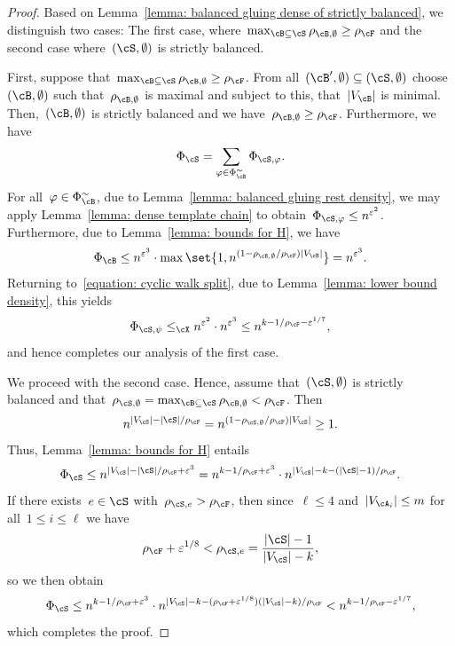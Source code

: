 \documentclass[11pt]{amsart}
\newcommand{\eps}{\varepsilon}
\DeclarePairedDelimiter{\abs}{\lvert}{\rvert}
\newcommand{\Xleq}{\leq_{\cX}}
\def\phi{\varphi}
\theoremstyle{definition}
\numberwithin{equation}{section}
\begin{document}
	\begin{proof}
		Based on Lemma~\ref{lemma: balanced gluing dense of strictly balanced}, we distinguish two cases: The first case, where~$\max_{\cB\subseteq \cS}\rho_{\cB,\emptyset}\geq \rho_\cF$ and the second case where~$(\cS,\emptyset)$ is strictly balanced.
		
		First, suppose that~$\max_{\cB\subseteq \cS}\rho_{\cB,\emptyset}\geq \rho_\cF$.
		From all~$(\cB',\emptyset)\subseteq(\cS,\emptyset)$ choose~$(\cB,\emptyset)$ such that~$\rho_{\cB,\emptyset}$ is maximal and subject to this, that~$\abs{V_\cB}$ is minimal.
		Then,~$(\cB,\emptyset)$ is strictly balanced and we have~$\rho_{\cB,\emptyset}\geq\rho_\cF$.
		Furthermore, we have
		\begin{equation}\label{equation: cyclic walk split}
			\Phi_{\cS}=\sum_{\phi\in \Phi_{\cB}^\sim} \Phi_{\cS,\phi}.
		\end{equation}
		For all~$\phi\in \Phi_{\cB}^\sim$, due to Lemma~\ref{lemma: balanced gluing rest density}, we may apply Lemma~\ref{lemma: dense template chain} to obtain~$\Phi_{\cS,\phi}\leq n^{\eps^2}$.
		Furthermore, due to Lemma~\ref{lemma: bounds for H}, we have
		\begin{equation*}
			\Phi_{\cB}
			\leq n^{\eps^3}\cdot\max\set{1,n^{(1-\rho_{\cB,\emptyset}/\rho_\cF)\abs{V_\cB}}}
			= n^{\eps^3}.
		\end{equation*}
		Returning to~\eqref{equation: cyclic walk split}, due to Lemma~\ref{lemma: lower bound density}, this yields
		\begin{equation*}
			\Phi_{\cS,\psi}
			\Xleq n^{\eps^2}\cdot n^{\eps^{3}}
			\leq n^{k-1/\rho_\cF-\eps^{1/7}},
		\end{equation*}
		and hence completes our analysis of the first case.
		
		We proceed with the second case.
		Hence, assume that~$(\cS,\emptyset)$ is strictly balanced and that~$\rho_{\cS,\emptyset}=\max_{\cB\subseteq \cS}\rho_{\cB,\emptyset}< \rho_\cF$.
		Then
		\begin{equation*}
			n^{\abs{V_\cS}-\abs{\cS}/\rho_\cF}
			=n^{(1-\rho_{\cS,\emptyset}/\rho_\cF)\abs{V_\cS}}
			\geq 1.
		\end{equation*}
		Thus, Lemma~\ref{lemma: bounds for H} entails
		\begin{equation*}
			\Phi_{\cS}
			\leq n^{\abs{V_\cS}-\abs{\cS}/\rho_\cF+\eps^3}
			= n^{k-1/\rho_\cF+\eps^3}\cdot n^{\abs{V_\cS}-k-(\abs{\cS}-1)/\rho_\cF}.
		\end{equation*}
		If there exists~$e\in\cS$ with~$\rho_{\cS,e}>\rho_\cF$, then since~$\ell\leq 4$ and~$\abs{V_{\cA_i}}\leq m$ for all~$1\leq i\leq\ell$ we have
		\begin{equation*}
			\rho_\cF+\eps^{1/8}<\rho_{\cS,e}=\frac{\abs{\cS}-1}{\abs{V_\cS}-k},
		\end{equation*}
		so we then obtain
		\begin{equation*}
			\Phi_{\cS}
			\leq n^{k-1/\rho_\cF+\eps^3}\cdot n^{\abs{V_\cS}-k-(\rho_\cF+\eps^{1/8})(\abs{V_\cS}-k)/\rho_\cF}
			<n^{k-1/\rho_\cF-\eps^{1/7}},
		\end{equation*}
		which completes the proof.
	\end{proof}
	
\end{document}
